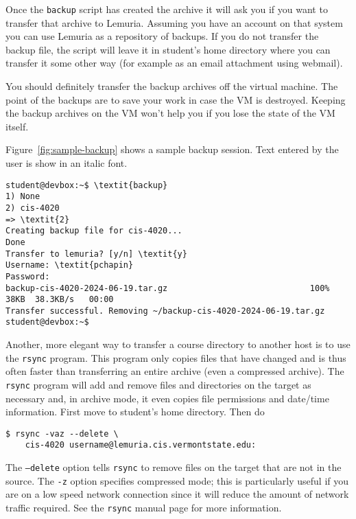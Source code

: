 \documentclass{article}
\newcommand{\command}[1]{\texttt{#1}}
\begin{document}
Once the \command{backup} script has created the archive it will ask you if you want to transfer
that archive to Lemuria. Assuming you have an account on that system you can use Lemuria as a
repository of backups. If you do not transfer the backup file, the script will leave it in
student's home directory where you can transfer it some other way (for example as an email
attachment using webmail).

You should definitely transfer the backup archives off the virtual machine. The point of the
backups are to save your work in case the VM is destroyed. Keeping the backup archives on the VM
won't help you if you lose the state of the VM itself.

Figure~\ref{fig:sample-backup} shows a sample backup session. Text entered by the user is show
in an italic font.

\begin{figure*}[t]
\begin{Verbatim}[fontsize=\small, frame=single, commandchars=\\\{\}]
student@devbox:~$ \textit{backup}
1) None
2) cis-4020
=> \textit{2}
Creating backup file for cis-4020...
Done
Transfer to lemuria? [y/n] \textit{y}
Username: \textit{pchapin}
Password: 
backup-cis-4020-2024-06-19.tar.gz                             100%   38KB  38.3KB/s   00:00    
Transfer successful. Removing ~/backup-cis-4020-2024-06-19.tar.gz
student@devbox:~$
\end{Verbatim}
\caption{Sample Backup Session}
\label{fig:sample-backup}
\end{figure*}

Another, more elegant way to transfer a course directory to another host is to use the
\command{rsync} program. This program only copies files that have changed and is thus often
faster than transferring an entire archive (even a compressed archive). The \command{rsync}
program will add and remove files and directories on the target as necessary and, in archive
mode, it even copies file permissions and date/time information. First move to student's home
directory. Then do
\begin{Verbatim}
$ rsync -vaz --delete \
    cis-4020 username@lemuria.cis.vermontstate.edu:
\end{Verbatim}

The \command{--delete} option tells \command{rsync} to remove files on the target that are not in
the source. The \command{-z} option specifies compressed mode; this is particularly useful if you
are on a low speed network connection since it will reduce the amount of network traffic
required. See the \command{rsync} manual page for more information.
\end{document}
